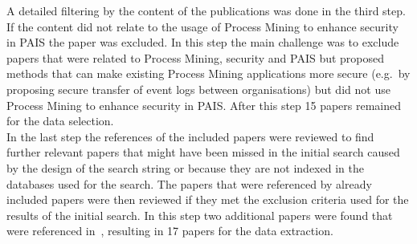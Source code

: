 \documentclass[runningheads]{llncs}
\begin{document}
A detailed filtering by the content of the publications was done in the third step. If the content did not relate to the usage of Process Mining to enhance security in PAIS the paper was excluded. In this step the main challenge was to exclude papers that were
related to Process Mining, security and PAIS but proposed methods that can make existing Process Mining applications more secure (e.g.\ by proposing secure transfer of event logs between organisations) but did not use Process Mining to enhance security in PAIS. After this step 15 papers
remained for the data selection.\\
In the last step the references of the included papers were reviewed to find further relevant papers that might have been missed in the initial search caused by the design of the search string or because they are not indexed in the databases used for the search.
The papers that were referenced by already included papers were then reviewed if they met the exclusion criteria used for the results of the initial search. In this step two additional papers were found that were referenced in~\cite{Silalahi20221}, resulting in 17
papers for the data extraction.
\end{document}
